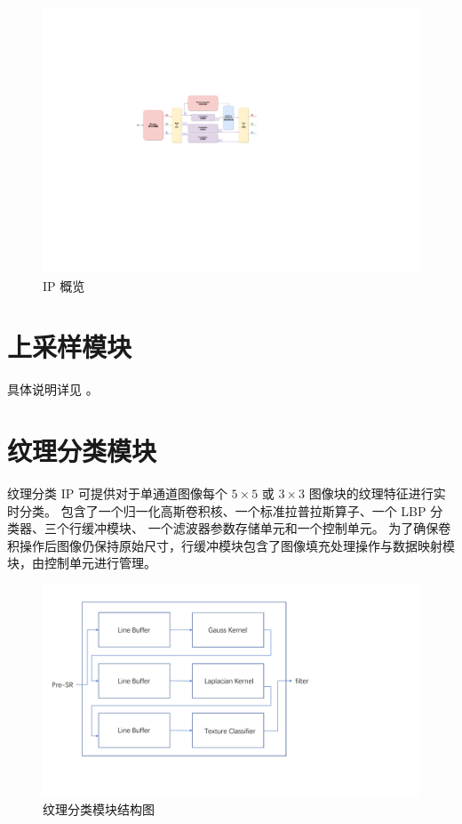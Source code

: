 \documentclass[12pt, a4paper, oneside]{ctexbook}
\begin{document}
	\begin{figure}[h]
		\centering
		\includegraphics[scale=0.4]{pic/all.drawio.pdf}
		\caption{IP 概览}
		\label{fig:ip-overview}
	\end{figure}
	
	\section{上采样模块}
	具体说明详见 \textbf{}。
	
	\section{纹理分类模块}
	纹理分类 IP 可提供对于单通道图像每个 $5\times5$ 或 $3\times3$ 图像块的纹理特征进行实时分类。
	包含了一个归一化高斯卷积核、一个标准拉普拉斯算子、一个 LBP 分类器、三个行缓冲模块、
	一个滤波器参数存储单元和一个控制单元。
	为了确保卷积操作后图像仍保持原始尺寸，行缓冲模块包含了图像填充处理操作与数据映射模块，由控制单元进行管理。
	
	\begin{figure}[h]
		\centering
		\includegraphics[scale=0.55]{./pic/texture}
		\caption{纹理分类模块结构图}
		\label{fig:texture}
	\end{figure}
	
\end{document}
